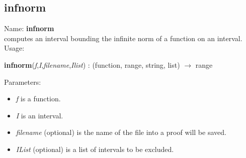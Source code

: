 \subsection{infnorm}
\label{labinfnorm}
\noindent Name: \textbf{infnorm}\\
computes an interval bounding the infinite norm of a function on an interval.\\

\noindent Usage: 
\begin{center}
\textbf{infnorm}(\emph{f},\emph{I},\emph{filename},\emph{Ilist}) : (\textsf{function}, \textsf{range}, \textsf{string}, \textsf{list}) $\rightarrow$ \textsf{range}\\
\end{center}
Parameters: 
\begin{itemize}
\item \emph{f} is a function.
\item \emph{I} is an interval.
\item \emph{filename} (optional) is the name of the file into a proof will be saved.
\item \emph{IList} (optional) is a list of intervals to be excluded.
\end{itemize}
